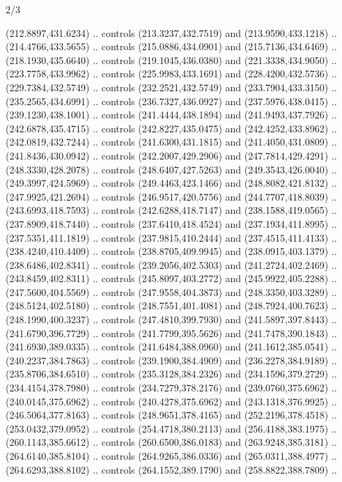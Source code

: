 \begin{flagdescription}{2/3}
\begin{scope}[shift={(0.5\flaglength,0.5)},scale=\flagwidth/545]
\begin{scope}[y=0.80pt, x=0.80pt, yscale=-1,shift={(-297,-430)}]
\begin{scope}[shift={(28.51887,-25.61095)}]
  (212.8897,431.6234) .. controls (213.3237,432.7519) and (213.9590,433.1218) ..
  (214.4766,433.5655) .. controls (215.0886,434.0901) and (215.7136,434.6469) ..
  (218.1930,435.6640) .. controls (219.1045,436.0380) and (221.3338,434.9050) ..
  (223.7758,433.9962) .. controls (225.9983,433.1691) and (228.4200,432.5736) ..
  (229.7384,432.5749) .. controls (232.2521,432.5749) and (233.7904,433.3150) ..
  (235.2565,434.6991) .. controls (236.7327,436.0927) and (237.5976,438.0415) ..
  (239.1230,438.1001) .. controls (241.4444,438.1894) and (241.9493,437.7926) ..
  (242.6878,435.4715) .. controls (242.8227,435.0475) and (242.4252,433.8962) ..
  (242.0819,432.7244) .. controls (241.6300,431.1815) and (241.4050,431.0809) ..
  (241.8436,430.0942) .. controls (242.2007,429.2906) and (247.7814,429.4291) ..
  (248.3330,428.2078) .. controls (248.6407,427.5263) and (249.3543,426.0040) ..
  (249.3997,424.5969) .. controls (249.4463,423.1466) and (248.8082,421.8132) ..
  (247.9925,421.2694) .. controls (246.9517,420.5756) and (244.7707,418.8039) ..
  (243.6993,418.7593) .. controls (242.6288,418.7147) and (238.1588,419.0565) ..
  (237.8909,418.7440) .. controls (237.6410,418.4524) and (237.1934,411.8995) ..
  (237.5351,411.1819) .. controls (237.9815,410.2444) and (237.4515,411.4133) ..
  (238.4240,410.4409) .. controls (238.8705,409.9945) and (238.0915,403.1379) ..
  (238.6486,402.8341) .. controls (239.2056,402.5303) and (241.2724,402.2469) ..
  (243.8459,402.8311) .. controls (245.8097,403.2772) and (245.9922,405.2288) ..
  (247.5600,404.5569) .. controls (247.9558,404.3873) and (248.3350,403.3289) ..
  (248.5124,402.5180) .. controls (248.7551,401.4081) and (248.7924,400.7623) ..
  (248.1990,400.3237) .. controls (247.4810,399.7930) and (241.5897,397.8443) ..
  (241.6790,396.7729) .. controls (241.7799,395.5626) and (241.7478,390.1843) ..
  (241.6930,389.0335) .. controls (241.6484,388.0960) and (241.1612,385.0541) ..
  (240.2237,384.7863) .. controls (239.1900,384.4909) and (236.2278,384.9189) ..
  (235.8706,384.6510) .. controls (235.3128,384.2326) and (234.1596,379.2729) ..
  (234.4154,378.7980) .. controls (234.7279,378.2176) and (239.0760,375.6962) ..
  (240.0145,375.6962) .. controls (240.4278,375.6962) and (243.1318,376.9925) ..
  (246.5064,377.8163) .. controls (248.9651,378.4165) and (252.2196,378.4518) ..
  (253.0432,379.0952) .. controls (254.4718,380.2113) and (256.4188,383.1975) ..
  (260.1143,385.6612) .. controls (260.6500,386.0183) and (263.9248,385.3181) ..
  (264.6140,385.8104) .. controls (264.9265,386.0336) and (265.0311,388.4977) ..
  (264.6293,388.8102) .. controls (264.1552,389.1790) and (258.8822,388.7809) ..

\end{scope}
\end{scope}
\end{scope}
\end{flagdescription}
